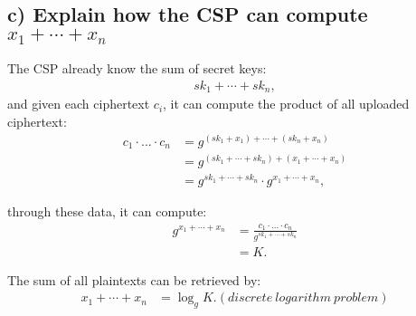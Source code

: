\subsection*{c) Explain how the CSP can compute \(x_1+\cdots+x_n\)}
%
The CSP already know the sum of secret keys:
\begin{align*}
    sk_1+\cdots+sk_n,
\end{align*}
and given each ciphertext \(c_i\), it can compute the product of all uploaded ciphertext:
\begin{align*}
    c_1\cdot...\cdot c_n &= g^{(sk_1+x_1)+\cdots +(sk_n+x_n)}\\
    &= g^{(sk_1+\cdots +sk_n)+(x_1+\cdots +x_n)}\\
    &= g^{sk_1+\cdots +sk_n}\cdot g^{x_1+\cdots +x_n},    
\end{align*}

through these data, it can compute:
\begin{align*}
    g^{x_1+\cdots +x_n} &= \frac{c_1\cdot...\cdot c_n}{g^{sk_1+\cdots +sk_n}}\\
    &= K.
\end{align*}

The sum of all plaintexts can be retrieved by:
\begin{align*}
    x_1+\cdots+x_n &= \log_{g}K. (discrete\ logarithm\ problem)
\end{align*}